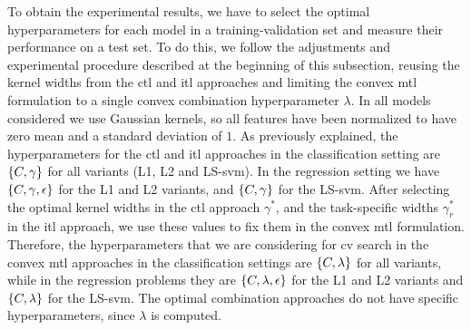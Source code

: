 To obtain the experimental results, we have to select the optimal hyperparameters for each model in a training-validation set and measure their performance on a test set. To do this, we follow the adjustments and experimental procedure described at the beginning of this subsection, reusing the kernel widths from the \acrshort{ctl} and \acrshort{itl} approaches and limiting the convex \acrshort{mtl} formulation to a single convex combination hyperparameter $\lambda$.
%
In all models considered we use Gaussian kernels, so all features have been normalized to have zero mean and a standard deviation of $1$.
As previously explained, the hyperparameters for the \acrshort{ctl} and \acrshort{itl} approaches in the classification setting are $\left\{C, \gamma\right\}$ for all variants (L1, L2 and LS-\acrshort{svm}).
In the regression setting we have $\left\{C, \gamma, \epsilon\right\}$ for the L1 and L2 variants, and $\left\{C, \gamma\right\}$ for the LS-\acrshort{svm}.
%
After selecting the optimal kernel widths in the \acrshort{ctl} approach $\gamma^*$, and the task-specific widths $\gamma_r^*$ in the \acrshort{itl} approach, we use these values to fix them in the convex \acrshort{mtl} formulation.
Therefore, the hyperparameters that we are considering for \acrshort{cv} search in the convex \acrshort{mtl} approaches in the classification settings are $\left\{C, \lambda\right\}$ for all variants, while in the regression problems they are $\left\{C, \lambda, \epsilon\right\}$ for the L1 and L2 variants and $\left\{C, \lambda\right\}$ for the LS-\acrshort{svm}.
%
The optimal combination approaches do not have specific hyperparameters, since $\lambda$ is computed.
%

